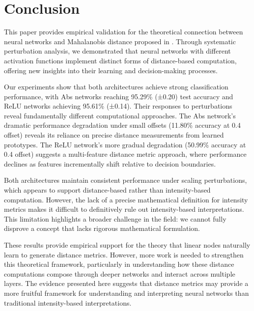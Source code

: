 \section{Conclusion}

This paper provides empirical validation for the theoretical connection between neural networks and Mahalanobis distance proposed in \citep{oursland2024interpreting}. Through systematic perturbation analysis, we demonstrated that neural networks with different activation functions implement distinct forms of distance-based computation, offering new insights into their learning and decision-making processes.

Our experiments show that both architectures achieve strong classification performance, with Abs networks reaching 95.29\% (±0.20) test accuracy and ReLU networks achieving 95.61\% (±0.14). Their responses to perturbations reveal fundamentally different computational approaches. The Abs network's dramatic performance degradation under small offsets (11.80\% accuracy at 0.4 offset) reveals its reliance on precise distance measurements from learned prototypes. The ReLU network's more gradual degradation (50.99\% accuracy at 0.4 offset) suggests a multi-feature distance metric approach, where performance declines as features incrementally shift relative to decision boundaries.

Both architectures maintain consistent performance under scaling perturbations, which appears to support distance-based rather than intensity-based computation. However, the lack of a precise mathematical definition for intensity metrics makes it difficult to definitively rule out intensity-based interpretations. This limitation highlights a broader challenge in the field: we cannot fully disprove a concept that lacks rigorous mathematical formulation.

These results provide empirical support for the theory that linear nodes naturally learn to generate distance metrics. However, more work is needed to strengthen this theoretical framework, particularly in understanding how these distance computations compose through deeper networks and interact across multiple layers. The evidence presented here suggests that distance metrics may provide a more fruitful framework for understanding and interpreting neural networks than traditional intensity-based interpretations.